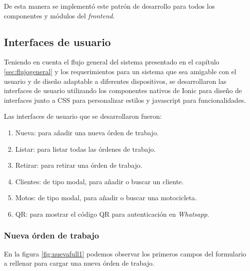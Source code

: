 De esta manera se implementó este patrón de desarrollo para todos los componentes y módulos del \textit{frontend}.

\subsection{Interfaces de usuario}
\label{subsec:frontinterfaces}

Teniendo en cuenta el flujo general del sistema presentado en el capítulo \ref{sec:flujogeneral} y los requerimientos para un sistema que sea amigable con el usuario y de diseño adaptable a diferentes dispositivos, se desarrollaron las interfaces de usuario utilizando los componentes nativos de Ionic para diseño de interfaces junto a CSS para personalizar estilos y javascript para funcionalidades. 

Las interfaces de usuario que se desarrollaron fueron:

\begin{enumerate}
\item Nueva: para añadir una nueva órden de trabajo.
\item Listar: para listar todas las órdenes de trabajo.
\item Retirar: para retirar una órden de trabajo.
\item Clientes: de tipo modal, para añadir o buscar un cliente.
\item Motos: de tipo modal, para añadir o buscar una motocicleta.
\item QR: para mostrar el código QR para autenticación en \textit{Whatsapp}.
\end{enumerate}

\subsubsection{Nueva órden de trabajo}
\label{subsubsec:frontnuevaorden}
En la figura \ref{fig:nuevafull1} podemos observar los primeros campos del formulario a rellenar para cargar una nueva órden de trabajo.

